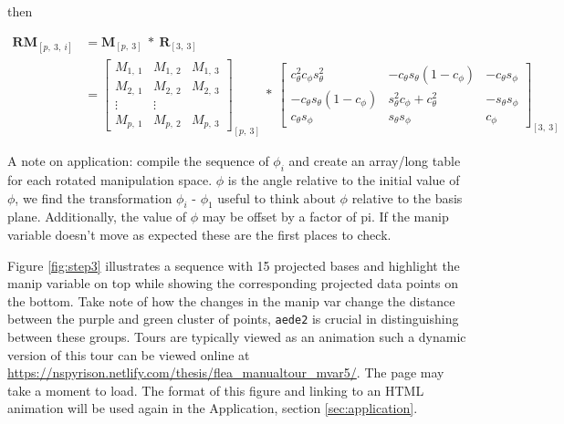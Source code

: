 \documentclass{monashthesis}
\theoremstyle{definition}
\theoremstyle{definition}
\theoremstyle{definition}
\theoremstyle{remark}
\begin{document}
then

\begin{align*}
  \textbf{RM}_{[p,~3,~i]}
  &= \textbf{M}_{[p,~3]} ~*~ \textbf{R}_{[3,~3]} \\
  &= \begin{bmatrix}
    M_{1,~1} & M_{1,~2} & M_{1,~3} \\
    M_{2,~1} & M_{2,~2} & M_{2,~3} \\
    \vdots   & \vdots   \\
    M_{p,~1} & M_{p,~2} & M_{p,~3}
  \end{bmatrix}_{[p,~3]}
    ~*~
  \begin{bmatrix}
    c_\theta^2 c_\phi s_\theta^2 &
    -c_\theta s_\theta (1 - c_\phi) &
    -c_\theta s_\phi \\
    -c_\theta s_\theta (1 - c_\phi) &
    s_\theta^2 c_\phi + c_\theta^2 &
    -s_\theta s_\phi \\
    c_\theta s_\phi &
    s_\theta s_\phi &
    c_\phi
  \end{bmatrix}_{[3,~3]}
\end{align*}

A note on application: compile the sequence of \(\phi_i\) and create an
array/long table for each rotated manipulation space. \(\phi\) is the
angle relative to the initial value of \(\phi\), we find the
transformation \(\phi_i\) - \(\phi_1\) useful to think about \(\phi\)
relative to the basis plane. Additionally, the value of \(\phi\) may be
offset by a factor of pi. If the manip variable doesn't move as expected
these are the first places to check.

\begin{Shaded}
\begin{Highlighting}[]
 
\StringTok{ }\OperatorTok{+}\StringTok{ }
\StringTok{ }\NormalTok{(manip_space, theta, phi)[, }\OperatorTok{:}\NormalTok{]}
\NormalTok{\}}
\end{Highlighting}
\end{Shaded}

Figure \ref{fig:step3} illustrates a sequence with 15 projected bases
and highlight the manip variable on top while showing the corresponding
projected data points on the bottom. Take note of how the changes in the
manip var change the distance between the purple and green cluster of
points, \texttt{aede2} is crucial in distinguishing between these
groups. Tours are typically viewed as an animation such a dynamic
version of this tour can be viewed online at
\url{https://nspyrison.netlify.com/thesis/flea_manualtour_mvar5/}. The
page may take a moment to load. The format of this figure and linking to
an HTML animation will be used again in the Application, section
\ref{sec:application}.
\end{document}
